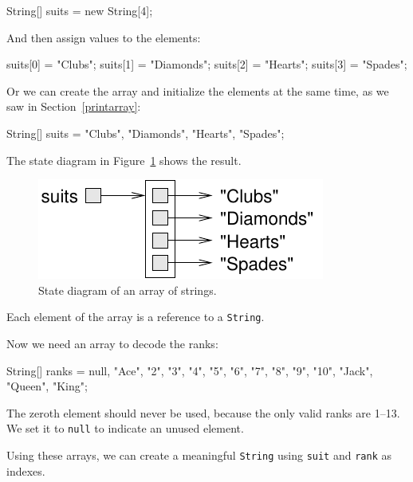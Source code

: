 \documentclass[12pt]{book}
\theoremstyle{exercise}
\newcommand{\java}[1]{\verb"#1"}
\begin{document}
\begin{code}
    String[] suits = new String[4];
\end{code}

And then assign values to the elements:

\begin{code}
    suits[0] = "Clubs";
    suits[1] = "Diamonds";
    suits[2] = "Hearts";
    suits[3] = "Spades";
\end{code}

Or we can create the array and initialize the elements at the same time, as we saw in Section~\ref{printarray}:

\begin{code}
    String[] suits = {"Clubs", "Diamonds", "Hearts", "Spades"};
\end{code}


The state diagram in Figure~\ref{fig.stringarray} shows the result.

\begin{figure}
\begin{center}
\includegraphics{figs/stringarray.pdf}
\caption{State diagram of an array of strings.}
\label{fig.stringarray}
\end{center}
\end{figure}


Each element of the array is a reference to a \java{String}.

Now we need an array to decode the ranks:

\begin{code}
    String[] ranks = {null, "Ace", "2", "3", "4", "5", "6",
               "7", "8", "9", "10", "Jack", "Queen", "King"};
\end{code}

The zeroth element should never be used, because the only valid ranks are 1--13.
We set it to \java{null} to indicate an unused element.

Using these arrays, we can create a meaningful \java{String} using \java{suit} and \java{rank} as indexes.
\end{document}
